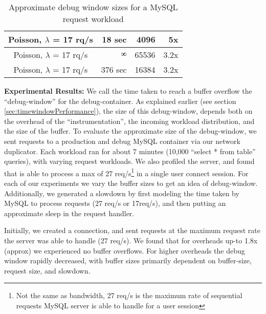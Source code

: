 \begin{table}[ht]
\begin{tabular}{|c|r|r|r|}
		Poisson, $\lambda$ = 17 rq/s                                        & 18 sec                                                                             & 4096                                                                            & 5x                                                                               \\ \hline
		Poisson, $\lambda$ = 17 rq/s                                        & $\infinity$                                                                                     & 65536                                                                           & 3.2x                                                                             \\ \hline
		Poisson, $\lambda$ = 17 rq/s                                        & 376 sec                                                                            & 16384                                                                           & 3.2x                                                                             \\ \hline
	\end{tabular}
	\caption{Approximate debug window sizes for a MySQL request workload}
	\label{table:timewindow}
\end{table}

\noindent
\textbf{Experimental Results:} We call the time taken to reach a buffer overflow the ``debug-window'' for the debug-container.
As explained earlier (see section \ref{sec:timewindowPerformance}), the size of this debug-window, depends both on the overhead of the ``instrumentation'', the incoming workload distribution, and the size of the buffer.
To evaluate the approximate size of the debug-window, we sent requests to a production and debug MySQL container via our network duplicator.
Each workload ran for about 7 minutes (10,000 ``select * from table'' queries), with varying request workloads.
We also profiled the server, and found that is able to process a max of 27 req/s\footnote{Not the same as bandwidth, 27 req/s is the maximum rate of sequential requests MySQL server is able to handle for a user session} in a single user connect session. 
For each of our experiments we vary the buffer sizes to get an idea of debug-window. 
Additionally, we generated a slowdown by first modeling the time taken by MySQL to process requests (27 req/s or 17req/s), and then putting an approximate sleep in the request handler.

Initially, we created a connection, and sent requests at the maximum request rate the server was able to handle (27 req/s).
We found that for overheads up-to 1.8x (approx) we experienced no buffer overflows.
For higher overheads the debug window rapidly decreased, with buffer sizes primarily dependent on buffer-size, request size, and slowdown.

